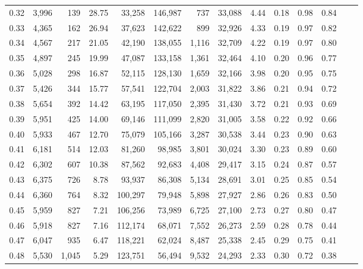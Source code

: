 \begin{tabular}{rrrrrrrrrrrrrr}
0.32 &  3,996 &    139 &   28.75 &   33,258 &  146,987 &     737 &  33,088 &  4.44 &  0.18 &  0.98 &      0.84 \\
0.33 &  4,365 &    162 &   26.94 &   37,623 &  142,622 &     899 &  32,926 &  4.33 &  0.19 &  0.97 &      0.82 \\
0.34 &  4,567 &    217 &   21.05 &   42,190 &  138,055 &   1,116 &  32,709 &  4.22 &  0.19 &  0.97 &      0.80 \\
0.35 &  4,897 &    245 &   19.99 &   47,087 &  133,158 &   1,361 &  32,464 &  4.10 &  0.20 &  0.96 &      0.77 \\
0.36 &  5,028 &    298 &   16.87 &   52,115 &  128,130 &   1,659 &  32,166 &  3.98 &  0.20 &  0.95 &      0.75 \\
0.37 &  5,426 &    344 &   15.77 &   57,541 &  122,704 &   2,003 &  31,822 &  3.86 &  0.21 &  0.94 &      0.72 \\
0.38 &  5,654 &    392 &   14.42 &   63,195 &  117,050 &   2,395 &  31,430 &  3.72 &  0.21 &  0.93 &      0.69 \\
0.39 &  5,951 &    425 &   14.00 &   69,146 &  111,099 &   2,820 &  31,005 &  3.58 &  0.22 &  0.92 &      0.66 \\
0.40 &  5,933 &    467 &   12.70 &   75,079 &  105,166 &   3,287 &  30,538 &  3.44 &  0.23 &  0.90 &      0.63 \\
0.41 &  6,181 &    514 &   12.03 &   81,260 &   98,985 &   3,801 &  30,024 &  3.30 &  0.23 &  0.89 &      0.60 \\
0.42 &  6,302 &    607 &   10.38 &   87,562 &   92,683 &   4,408 &  29,417 &  3.15 &  0.24 &  0.87 &      0.57 \\
0.43 &  6,375 &    726 &    8.78 &   93,937 &   86,308 &   5,134 &  28,691 &  3.01 &  0.25 &  0.85 &      0.54 \\
0.44 &  6,360 &    764 &    8.32 &  100,297 &   79,948 &   5,898 &  27,927 &  2.86 &  0.26 &  0.83 &      0.50 \\
0.45 &  5,959 &    827 &    7.21 &  106,256 &   73,989 &   6,725 &  27,100 &  2.73 &  0.27 &  0.80 &      0.47 \\
0.46 &  5,918 &    827 &    7.16 &  112,174 &   68,071 &   7,552 &  26,273 &  2.59 &  0.28 &  0.78 &      0.44 \\
0.47 &  6,047 &    935 &    6.47 &  118,221 &   62,024 &   8,487 &  25,338 &  2.45 &  0.29 &  0.75 &      0.41 \\
0.48 &  5,530 &  1,045 &    5.29 &  123,751 &   56,494 &   9,532 &  24,293 &  2.33 &  0.30 &  0.72 &      0.38 \\

\end{tabular}

